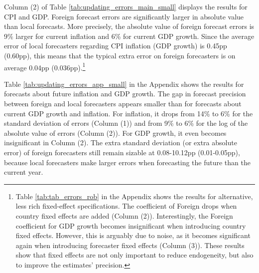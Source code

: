 Column (2) of Table \ref{tab:updating_errors_main_small} displays the results for CPI and GDP. Foreign forecast errors are significantly larger in absolute value than local forecasts. More precisely, the absolute value of foreign forecast errors is 9\% larger for current inflation and 6\% for current GDP growth. Since the average error of local forecasters regarding CPI inflation (GDP growth) is 0.45pp (0.60pp), this means that the typical extra error on foreign forecasters is on average 0.04pp (0.036pp).\footnote{Table \ref{tab:tab_errors_rob} in the Appendix shows the results for alternative, less rich fixed-effect specifications. The coefficient of Foreign drops when country fixed effects are added (Column (2)). Interestingly, the Foreign coefficient for GDP growth becomes insignificant when introducing country fixed effects. However, this is arguably due to noise, as it becomes significant again when introducing forecaster fixed effects (Column (3)). These results show that fixed effects are not only important to reduce endogeneity, but also to improve the estimates' precision.} %


Table \ref{tab:updating_errors_app_small} in the Appendix shows the results for forecasts about future inflation and GDP growth. The gap in forecast precision between foreign and local forecasters appears smaller than for forecasts about current GDP growth and inflation. For inflation, it drops from 14\% to 6\% for the standard deviation of errors (Column (1)) and from 9\% to 6\% for the log of the absolute value of errors (Column (2)). For GDP growth, it even becomes insignificant in Column (2). The extra standard deviation (or extra absolute error) of foreign forecasters still remain sizable at 0.08-10.12pp (0.01-0.05pp), because local forecasters make larger errors when forecasting the future than the current year.
